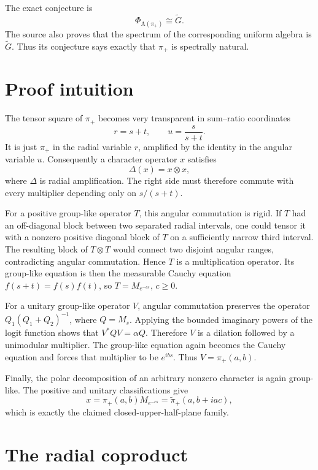 \documentclass[11pt]{article}
\newcommand{\A}{\mathrm A}
\newcommand{\wt}{\widetilde}
\newcommand{\PhiA}{\Phi_{\A(\pi_+)}}
\begin{document}
The exact conjecture is
\[
 \boxed{\ \PhiA\cong\wt G.\ }
\]
The source also proves that the spectrum of the corresponding uniform algebra
is $\wt G$.  Thus its conjecture says exactly that $\pi_+$ is spectrally
natural.

\section{Proof intuition}

The tensor square of $\pi_+$ becomes very transparent in sum--ratio
coordinates
\[
 r=s+t,\qquad u=\frac{s}{s+t}.
\]
It is just $\pi_+$ in the radial variable $r$, amplified by the identity in
the angular variable $u$.  Consequently a character operator $x$ satisfies
\[
 \Delta(x)=x\otimes x,
\]
where $\Delta$ is radial amplification.  The right side must therefore
commute with every multiplier depending only on $s/(s+t)$.

For a positive group-like operator $T$, this angular commutation is rigid.
If $T$ had an off-diagonal block between two separated radial intervals, one
could tensor it with a nonzero positive diagonal block of $T$ on a sufficiently
narrow third interval.  The resulting block of $T\otimes T$ would connect two
disjoint angular ranges, contradicting angular commutation.  Hence $T$ is a
multiplication operator.  Its group-like equation is then the measurable
Cauchy equation $f(s+t)=f(s)f(t)$, so $T=M_{e^{-cs}}$, $c\geq0$.

For a unitary group-like operator $V$, angular commutation preserves the
operator $Q_1(Q_1+Q_2)^{-1}$, where $Q=M_s$.  Applying the bounded imaginary
powers of the logit function shows that
$V^*QV=\alpha Q$.  Therefore $V$ is a dilation followed by a unimodular
multiplier.  The group-like equation again becomes the Cauchy equation and
forces that multiplier to be $e^{ibs}$.  Thus $V=\pi_+(a,b)$.

Finally, the polar decomposition of an arbitrary nonzero character is again
group-like.  The positive and unitary classifications give
\[
 x=\pi_+(a,b)M_{e^{-cs}}=\wt\pi_+(a,b+iac),
\]
which is exactly the claimed closed-upper-half-plane family.

\section{The radial coproduct}
\end{document}
